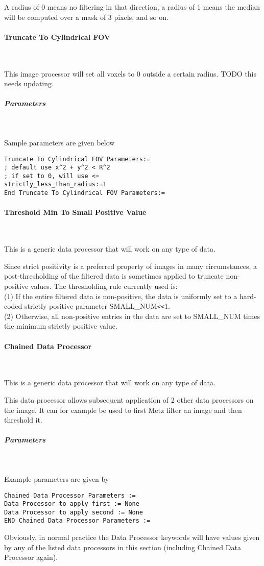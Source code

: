 \documentclass{article}
\newcommand{\tab}{\hspace{5mm}}
\newcommand{\subsubsubsection}[1]{\paragraph{#1}\mbox{} \\}
\newcommand{\subsubsubsubsection}[1]{\subparagraph{#1} \mbox{} \\}
\begin{document}
{A radius of 0 means no filtering in that direction, a radius 
of 1 means the median will be computed over a mask of 3 pixels, 
and so on.


{ \subsubsubsection{Truncate To Cylindrical FOV}
}
This image processor will set all voxels to 0 outside a certain radius.
TODO this needs updating.
{ \subsubsubsubsection{Parameters}
}
Sample parameters are given below
\begin{verbatim}
Truncate To Cylindrical FOV Parameters:=
; default use x^2 + y^2 < R^2
; if set to 0, will use <=
strictly_less_than_radius:=1 
End Truncate To Cylindrical FOV Parameters:=
\end{verbatim}

{ \subsubsubsection{Threshold Min To Small Positive Value}
}
This is a generic data processor that will work on any type of data.

Since strict positivity is a preferred property of images in 
many circumstances, a post-thresholding of the filtered data 
is sometimes applied to truncate non-positive values. The thresholding 
rule currently used is:\\
(1)\tab 
If the entire filtered data is non-positive, the data is uniformly 
set to a hard-coded strictly positive parameter SMALL\_NUM\texttt{<}\texttt{<}1.\\
(2)\tab 
Otherwise, all non-positive entries in the data are set to SMALL\_NUM 
times the minimum strictly positive value.


{ \subsubsubsection{Chained Data Processor}
}
This is a generic data processor that will work on any type of data.

This data processor allows subsequent application of 2 other 
data processors on the image. It can for example be used to 
first Metz filter an image and then threshold it.

{ \subsubsubsubsection{Parameters}
}
Example parameters are given by
\begin{verbatim}
Chained Data Processor Parameters :=
Data Processor to apply first := None
Data Processor to apply second := None
END Chained Data Processor Parameters :=
\end{verbatim}

Obviously, in normal practice the Data Processor keywords will 
have values given by any of the listed data processors in this 
section (including Chained Data Processor again).



}
\end{document}
